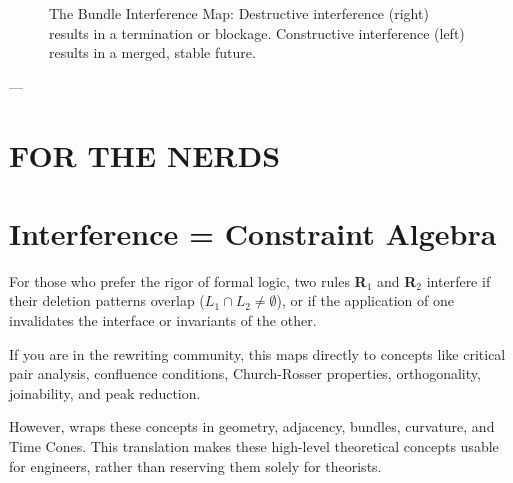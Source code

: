 \begin{figure}[h]
\centering
{}
\caption{The Bundle Interference Map: Destructive interference (right) results in a termination or blockage. Constructive interference (left) results in a merged, stable future.}
\end{figure}

---

\section*{\textbf{FOR THE NERDS\texttrademark}}

\section{\texorpdfstring{\textbf{Interference = Constraint Algebra}}{12.13 --- Interference = Constraint Algebra}}

For those who prefer the rigor of formal logic, two rules \textbf{R$_1$} and \textbf{R$_2$} interfere if their deletion patterns overlap ($L_1 \cap L_2 \neq \emptyset$), or if the application of one invalidates the interface or invariants of the other.

If you are in the rewriting community, this maps directly to concepts like critical pair analysis, confluence conditions, Church-Rosser properties, orthogonality, joinability, and peak reduction.

However, \COMPUTER{} wraps these concepts in geometry, adjacency, bundles, curvature, and Time Cones. This translation makes these high-level theoretical concepts usable for engineers, rather than reserving them solely for theorists.

